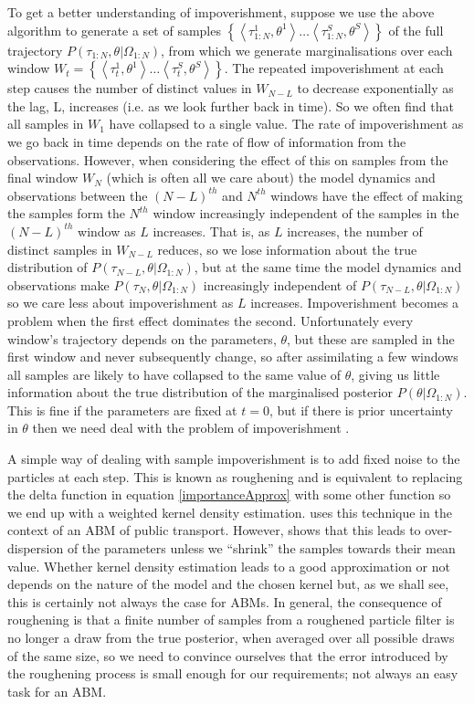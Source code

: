 \documentclass{article}
\begin{document}
To get a better understanding of impoverishment, suppose we use the above algorithm to generate a set of samples $\left\{\left<\tau_{1:N}^1,\theta^1\right> \dots \left<\tau_{1:N}^S,\theta^S\right>\right\}$ of the full trajectory $P(\tau_{1:N},\theta|\Omega_{1:N})$, from which we generate marginalisations over each window $W_t = \left\{\left<\tau_t^1,\theta^1\right> \dots \left<\tau_t^S,\theta^S\right>\right\}$. The repeated impoverishment at each step causes the number of distinct values in $W_{N-L}$ to decrease exponentially as the lag, L, increases (i.e. as we look further back in time). So we often find that all samples in $W_1$ have collapsed to a single value. The rate of impoverishment as we go back in time depends on the rate of flow of information from the observations. However, when considering the effect of this on samples from the final window $W_N$ (which is often all we care about) the model dynamics and observations between the $(N-L)^{th}$ and $N^{th}$ windows have the effect of making the samples form the $N^{th}$ window increasingly independent of the samples in the $(N-L)^{th}$ window as $L$ increases. That is, as $L$ increases, the number of distinct samples in $W_{N-L}$ reduces, so we lose information about the true distribution of $P(\tau_{N-L},\theta|\Omega_{1:N})$, but at the same time the model dynamics and observations make $P(\tau_{N},\theta|\Omega_{1:N})$ increasingly independent of $P(\tau_{N-L},\theta|\Omega_{1:N})$ so we care less about impoverishment as $L$ increases. Impoverishment becomes a problem when the first effect dominates the second. Unfortunately every window's trajectory depends on the parameters, $\theta$, but these are sampled in the first window and never subsequently change, so after assimilating a few windows all samples are likely to have collapsed to the same value of $\theta$, giving us little information about the true distribution of the marginalised posterior $P(\theta|\Omega_{1:N})$. This is fine if the parameters are fixed at $t=0$, but if there is prior uncertainty in $\theta$ then we need deal with the problem of impoverishment \citep*{liu2001combined, andrieu2004particle}.

A simple way of dealing with sample impoverishment is to add fixed noise to the particles at each step. This is known as roughening \citep*{gordon1993novel, li2014fight} and is equivalent to replacing the delta function in equation \eqref{importanceApprox} with some other function so we end up with a weighted kernel density estimation. \citet{kieu_dealing_2020} uses this technique in the context of an ABM of public transport. However, \citet{liu2001combined} shows that this leads to over-dispersion of the parameters unless we ``shrink'' the samples towards their mean value. Whether kernel density estimation leads to a good approximation or not depends on the nature of the model and the chosen kernel but, as we shall see, this is certainly not always the case for ABMs. In general, the consequence of roughening is that a finite number of samples from a roughened particle filter is no longer a draw from the true posterior, when averaged over all possible draws of the same size, so we need to convince ourselves that the error introduced by the roughening process is small enough for our requirements; not always an easy task for an ABM.
\end{document}
